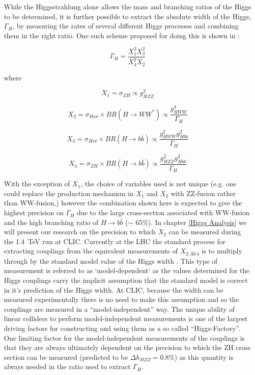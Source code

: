 While the Higgsstrahlung alone allows the mass and branching ratios of the Higgs to be determined, it is further possible to extract the absolute width of the Higgs, $\Gamma_H$, by measuring the rates of several different Higgs processes and combining them in the right ratio. One such scheme proposed for doing this is shown in  \cite{Durig:2014lfa}:

\begin{equation}
  \label{modelindependentformula}
  \Gamma_H = \frac{X_1^2X_3^2}{X_4^2X_2}
\end{equation}

where

\begin{equation}
X_1=\sigma_{ZH} \propto g_{HZZ}^2
\end{equation}

\begin{equation}
  \label{X2}
  X_2=\sigma_{H\nu\bar{\nu}} \times BR(H\rightarrow WW^*) \propto \frac{g_{HWW}^4}{\Gamma_H}
\end{equation}

\begin{equation}
X_3=\sigma_{H\nu\bar{\nu}} \times BR(H\rightarrow b\bar{b}) \propto \frac{g_{HWW}^{2}g_{Hbb}^2}{\Gamma_H}
\end{equation}

\begin{equation}
X_4=\sigma_{ZH} \times BR(H\rightarrow b\bar{b}) \propto \frac{g_{HZZ}^{2}g_{Hbb}^2}{\Gamma_H}
\end{equation}

 With the exception of $X_1$, the choice of variables used is not unique (e.g. one could replace the production mechanism in $X_1$ and $X_2$ with ZZ-fusion rather than WW-fusion,) however the combination shown here is expected to give the highest precision on $\Gamma_H$ due to the large cross-section associated with WW-fusion and the high branching ratio of $H\rightarrow b\bar{b}$ ($\sim$ 65\%). In chapter \ref{Higgs Analysis} we will present our research on the precision to which $X_2$ can be measured during the 1.4~TeV run at CLIC. Currently at the LHC the standard process for extracting couplings from the equivalent measurements of $X_{2,3\&4}$ is to multiply through by the standard model value of the Higgs width \cite{ATLAS-CONF-2015-044}. This type of measurement is referred to as `model-dependent` as the values determined for the Higgs couplings carry the implicit assumption that the standard model is correct in it's prediction of the Higgs width. At CLIC, because the width can be measured experimentally there is no need to make this assumption and so the couplings are measured in a ``model-independent'' way. The unique ability of linear colliders to perform model-independent measurements is one of the largest driving factors for constructing and using them as a so called ``Higgs-Factory''. One limiting factor for the model-independent measurements of the couplings is that they are always ultimately dependent on the precision to which the ZH cross section can be measured (predicted to be $\Delta h_{HZZ} = 0.8\%$) as this quantity is always needed in the ratio used to extract $\Gamma_H$.


